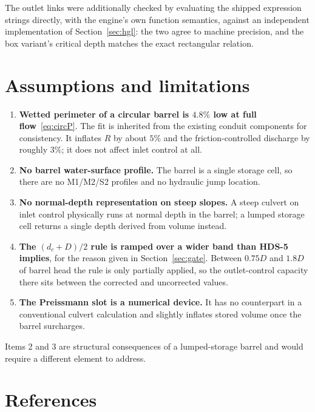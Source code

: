 \documentclass[11pt,a4paper]{article}
\begin{document}
\noindent
The outlet links were additionally checked by evaluating the shipped expression
strings directly, with the engine's own function semantics, against an
independent implementation of Section~\ref{sec:hgl}: the two agree to machine
precision, and the box variant's critical depth matches the exact rectangular
relation.

\section{Assumptions and limitations}\label{sec:limitations}

\begin{enumerate}[leftmargin=1.5em]
\item \textbf{Wetted perimeter of a circular barrel is $4.8\%$ low at full
      flow}~\eqref{eq:circP}. The fit is inherited from the existing conduit
      components for consistency. It inflates $R$ by about $5\%$ and the
      friction-controlled discharge by roughly $3\%$; it does not affect inlet
      control at all.

\item \textbf{No barrel water-surface profile.} The barrel is a single storage
      cell, so there are no M1/M2/S2 profiles and no hydraulic jump location.

\item \textbf{No normal-depth representation on steep slopes.} A steep culvert
      on inlet control physically runs at normal depth in the barrel; a lumped
      storage cell returns a single depth derived from volume instead.

\item \textbf{The $(d_c+D)/2$ rule is ramped over a wider band than HDS-5
      implies}, for the reason given in Section~\ref{sec:gate}. Between $0.75D$
      and $1.8D$ of barrel head the rule is only partially applied, so the
      outlet-control capacity there sits between the corrected and uncorrected
      values.

\item \textbf{The Preissmann slot is a numerical device.} It has no counterpart
      in a conventional culvert calculation and slightly inflates stored volume
      once the barrel surcharges.
\end{enumerate}

\noindent
Items 2 and 3 are structural consequences of a lumped-storage barrel and would
require a different element to address.

\section{References}
\end{document}
